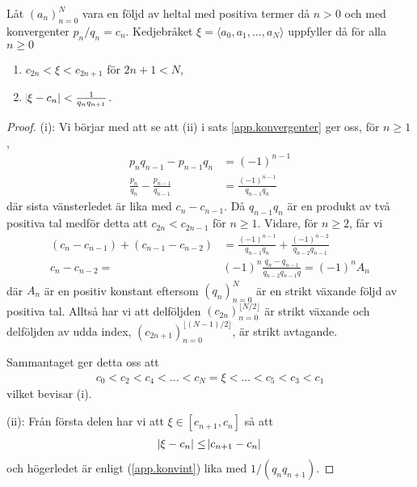 \begin{theorem} \label{app.kovfel}
    Låt \((a_n)_{n=0}^{N}\) vara en följd av heltal med positiva termer då \(n > 0\) och med konvergenter \(p_n / q_n = c_n\). Kedjebråket \(\xi = \langle a_0, a_1, \dots, a_N \rangle\) uppfyller då för alla \(n \geq 0\)
    \begin{enumerate}
        \item \(c_{2n} < \xi < c_{2n + 1}\) \quad för $2n + 1 < N$,
        \item \(\abs{\xi - c_n} < \frac{1}{q_n q_{n + 1}}\). 
    \end{enumerate}
\end{theorem}
\begin{proof}
    (i): Vi börjar med att se att (ii) i sats \ref{app.konvergenter} ger oss, för $n \geq 1$,
    \begin{align}
        p_n q_{n-1} - p_{n-1} q_{n} &= (-1)^{n-1} \nonumber \\
        \frac{p_n}{q_n} - \frac{p_{n-1}}{q_{n-1}} &= \frac{(-1)^{n-1}}{q_{n-1} q_n} \label{app.konvint}
    \end{align}
    där sista vänsterledet är lika med \(c_{n} - c_{n-1}\). Då \(q_{n-1} q_n\) är en produkt av två positiva tal medför detta att \(c_{2n} < c_{2n-1}\) för \(n \geq 1\). Vidare, för $n \geq 2$, får vi
    \begin{align*}
        (c_n - c_{n-1}) + (c_{n-1} - c_{n-2}) &= \frac{(-1)^{n-1}}{q_{n-1} q_n} + \frac{(-1)^{n-2}}{q_{n-2} q_{n-1}}  \\
        c_n - c_{n-2} =& (-1)^n \frac{q_n - q_{n - 1}}{q_{n-2}q_{n-1}q} = (-1)^{n} A_n 
    \end{align*}
    där $A_n$ är en positiv konstant eftersom $(q_n)_{n=0}^N$ är en strikt växande följd av positiva tal. Alltså har vi att delföljden \((c_{2n})_{n = 0}^{\lfloor N/2 \rfloor}\) är strikt växande och delföljden av udda index, \((c_{2n + 1})_{n = 0}^{\lfloor (N - 1)/2 \rfloor}\), är strikt avtagande. 
    
    Sammantaget ger detta oss att
    \begin{align*}
        c_0 < c_2 < c_4 < ... < c_N = \xi < ... < c_5 < c_3 < c_1
    \end{align*}
    vilket bevisar (i).
    
    (ii): Från första delen har vi att \(\xi \in [c_{n+1}, c_n]\) så att
    \begin{align*}
        \abs{\xi - c_n} \leq \abs{c_{n+1} - c_n} 
    \end{align*}
    och högerledet är enligt (\ref{app.konvint}) lika med \(1 / (q_n q_{n+1})\). 
\end{proof}

